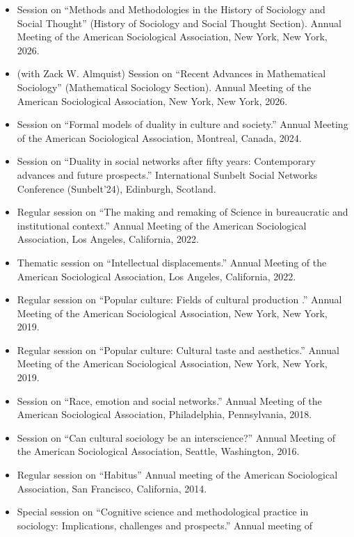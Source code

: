 \documentclass[
]{article}
\providecommand{\tightlist}{%
  \setlength{\itemsep}{0pt}\setlength{\parskip}{0pt}}
\begin{document}
\begin{itemize}
\tightlist
\item
  Session on ``Methods and Methodologies in the History of Sociology and
  Social Thought'' (History of Sociology and Social Thought Section).
  Annual Meeting of the American Sociological Association, New York, New
  York, 2026.
\item
  (with Zack W. Almquist) Session on ``Recent Advances in Mathematical
  Sociology'' (Mathematical Sociology Section). Annual Meeting of the
  American Sociological Association, New York, New York, 2026.
\item
  Session on ``Formal models of duality in culture and society.'' Annual
  Meeting of the American Sociological Association, Montreal, Canada,
  2024.
\item
  Session on ``Duality in social networks after fifty years:
  Contemporary advances and future prospects.'' International Sunbelt
  Social Networks Conference (Sunbelt'24), Edinburgh, Scotland.
\item
  Regular session on ``The making and remaking of Science in
  bureaucratic and institutional context.'' Annual Meeting of the
  American Sociological Association, Los Angeles, California, 2022.
\item
  Thematic session on ``Intellectual displacements.'' Annual Meeting of
  the American Sociological Association, Los Angeles, California, 2022.
\item
  Regular session on ``Popular culture: Fields of cultural production
  .'' Annual Meeting of the American Sociological Association, New York,
  New York, 2019.
\item
  Regular session on ``Popular culture: Cultural taste and aesthetics.''
  Annual Meeting of the American Sociological Association, New York, New
  York, 2019.
\item
  Session on ``Race, emotion and social networks.'' Annual Meeting of
  the American Sociological Association, Philadelphia, Pennsylvania,
  2018.
\item
  Session on ``Can cultural sociology be an interscience?'' Annual
  Meeting of the American Sociological Association, Seattle, Washington,
  2016.
\item
  Regular session on ``Habitus'' Annual meeting of the American
  Sociological Association, San Francisco, California, 2014.
\item
  Special session on ``Cognitive science and methodological practice in
  sociology: Implications, challenges and prospects.'' Annual meeting of

\end{itemize}
\end{document}
